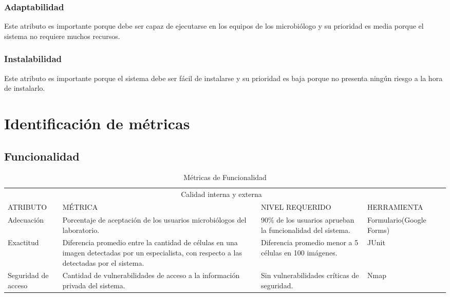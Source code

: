 \documentclass[12pt]{article}
\begin{document}
\subsubsection{Adaptabilidad}
\vspace*{0.2in}
Este atributo es importante porque debe ser capaz de ejecutarse en los equipos de los microbiólogo y su prioridad es media porque el sistema no requiere muchos recursos.
\subsubsection{Instalabilidad }
\vspace*{0.2in}
Este atributo es importante porque el sistema debe ser fácil de instalarse  y su prioridad es baja porque no presenta ningún riesgo a la hora de instalarlo.\\[4 cm]

\vspace*{0.9in}

\section{Identificación de métricas}%

\subsection{Funcionalidad}%

\vspace*{0.3in}
\begin{table}[htb]%
\centering
\begin{tabular}{|p{4cm}|p{4cm}|p{4cm}|p{4cm}|p{4cm}|}
\hline
\multicolumn{4}{|c|}{Calidad interna y externa   } \\
\cline{1-4}
ATRIBUTO & MÉTRICA & NIVEL REQUERIDO & HERRAMIENTA\\
\hline \hline
Adecuación 
& Porcentaje de aceptación de los usuarios microbiólogos del laboratorio. & 90\(\%\) de los usuarios aprueban la funcionalidad del sistema. 
& Formulario(Google Forms)\\ \cline{1-4}
\hline
Exactitud 
& Diferencia promedio entre la cantidad de células en una imagen detectadas por un especialista, con respecto a las detectadas por el sistema.
& Diferencia promedio menor a 5 células en 100 imágenes.
& JUnit\\ \cline{1-4}
\hline
Seguridad de acceso & Cantidad de vulnerabilidades de acceso a la información privada del sistema.
& Sin vulnerabilidades críticas de seguridad. 
& Nmap\\ \cline{1-4}
\hline
\end{tabular}
\caption{Métricas de Funcionalidad}
\label{tabla:final}
\end{table}%
\end{document}
